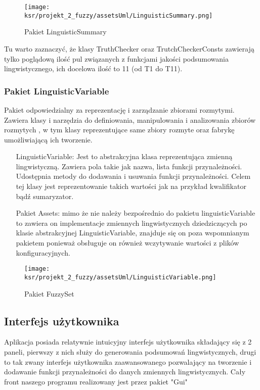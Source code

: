 \documentclass{article}
\begin{document}
\begin{figure}[H]
\centering
\texttt{[image: ksr/projekt\_2\_fuzzy/assetsUml/LinguisticSummary.png]}
\caption{Pakiet LinguisticSummary}
\label{fig:epsilon_bat}
\end{figure}

\noindent Tu warto zaznaczyć, że klasy TruthChecker oraz TrutchCheckerConsts zawierają tylko poglądową ilość pul związanych z funkcjami jakości podsumowania lingwistycznego, ich docelowa ilość to 11 (od T1 do T11).

\subsubsection{Pakiet LinguisticVariable}

\noindent Pakiet odpowiedzialny za reprezentację i zarządzanie zbiorami rozmytymi. Zawiera klasy i narzędzia do definiowania, manipulowania i analizowania zbiorów rozmytych \cite{niewiadomski19}, w tym klasy reprezentujące same zbiory rozmyte oraz fabrykę umożliwiającą ich tworzenie.

\begin{itemize}
    \item[LinguisticVariable:] Jest to abstrakcyjna klasa reprezentująca zmienną lingwistyczną. Zawiera pola takie jak nazwa, lista funkcji przynależności. Udostępnia metody do dodawania i usuwania funkcji przynależności. Celem tej klasy jest reprezentowanie takich wartości jak na przykład kwalifikator bądź sumaryzator.
    \item[Pakiet Assets:] mimo że nie należy bezpośrednio do pakietu linguisticVariable to zawiera on implementacje zmiennych lingwistycznych dziedziczących po klasie abstrakcyjnej LinguisticVariable, znajduje się on poza wspomnianym pakietem ponieważ obsługuje on również wczytywanie wartości z plików konfiguracyjnych.
\end{itemize}

\begin{figure}[H]
\centering
\texttt{[image: ksr/projekt\_2\_fuzzy/assetsUml/LinguisticVariable.png]}
\caption{Pakiet FuzzySet}
\label{fig:epsilon_bat}
\end{figure}

\subsection{Interfejs użytkownika}

\noindent Aplikacja posiada relatywnie intuicyjny interfejs użytkownika składający się z 2 paneli, pierwszy z nich służy do generowania podsumowań lingwistycznych, drugi to tak zwany interfejs użytkownika zaawansowanego pozwalający na tworzenie i dodawanie funkcji przynależności do danych zmiennych lingwistycznych. Cały front naszego programu realizowany jest przez pakiet "Gui" \\
\end{document}
